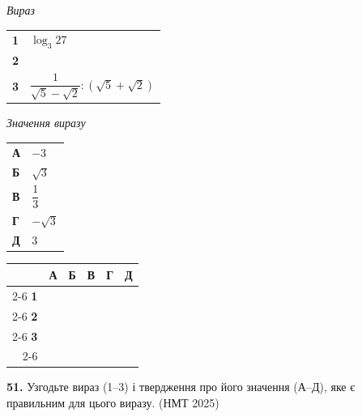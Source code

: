 \documentclass[14pt]{extarticle}
\newcommand{\answerGrid}{
    \begingroup
    \renewcommand{\arraystretch}{1.3} 
    \setlength{\tabcolsep}{7pt} 
    \begin{tabular}{r|c|c|c|c|c|}
         \multicolumn{1}{c}{} & \multicolumn{1}{c}{\textbf{А}} & \multicolumn{1}{c}{\textbf{Б}} & \multicolumn{1}{c}{\textbf{В}} & \multicolumn{1}{c}{\textbf{Г}} & \multicolumn{1}{c}{\textbf{Д}} \\ \cline{2-6}
         \textbf{1} & & & & & \\ \cline{2-6}
         \textbf{2} & & & & & \\ \cline{2-6}
         \textbf{3} & & & & & \\ \cline{2-6}
    \end{tabular}
    \endgroup
}
\newcommand{\matchingLayout}[3]{
    \noindent
    \begin{minipage}[t]{0.40\textwidth}
       
        #1
    \end{minipage}%
    \hfill
    \begin{minipage}[t]{0.28\textwidth}
        
        #2
    \end{minipage}%
    \hfill
    \begin{minipage}[t]{0.30\textwidth}
        \vspace{0pt} %
        \begin{flushright}
        #3
        \end{flushright}
    \end{minipage}
}
\newcommand{\nmtyear}[1]{\hfill{\small\color{yearcolor}(НМТ #1)}}
\begin{document}
\vspace{0.3cm}

\matchingLayout{
    \textit{Вираз} \par \vspace{0.2cm}
    \begin{tabular}{@{}p{0.5cm} l@{}}
    \textbf{1} & $\log_3 27$ \\[0.4cm]
    \textbf{2} & \trigStyle{$\operatorname{tg} \dfrac{2\pi}{3}$} \\[0.6cm]
    \textbf{3} & $\dfrac{1}{\sqrt{5}-\sqrt{2}} : (\sqrt{5}+\sqrt{2})$ \\
    \end{tabular}
}{
    \textit{Значення виразу} \par \vspace{0.2cm}
    \begin{tabular}{@{}p{0.5cm} l@{}}
    \textbf{А} & $-3$ \\[0.2cm]
    \textbf{Б} & $\sqrt{3}$ \\[0.2cm]
    \textbf{В} & $\dfrac{1}{3}$ \\[0.4cm]
    \textbf{Г} & $-\sqrt{3}$ \\[0.2cm]
    \textbf{Д} & $3$ \\
    \end{tabular}
}{
    \answerGrid
}

\vspace{0.7cm}

\noindent\textbf{51.} Узгодьте вираз (1--3) і твердження про його значення (А--Д), яке є правильним для цього виразу. \nmtyear{2025}

\vspace{0.3cm}
\end{document}
